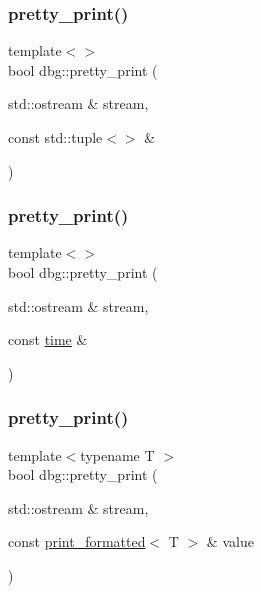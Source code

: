 \mbox{\label{namespacedbg_a077f3d4254963a89c600b07eb1b8608b}} 
\subsubsection{\texorpdfstring{pretty\+\_\+print()}{pretty\_print()}\hspace{0.1cm}{\footnotesize\ttfamily [12/19]}}
{\footnotesize\ttfamily template$<$$>$ \\
bool dbg\+::pretty\+\_\+print (\begin{DoxyParamCaption}\item[{std\+::ostream \&}]{stream,  }\item[{const std\+::tuple$<$$>$ \&}]{ }\end{DoxyParamCaption})\hspace{0.3cm}{\ttfamily [inline]}}

\mbox{\label{namespacedbg_a43fb1da62bd4a702ea7ca37e665c53c9}} 
\subsubsection{\texorpdfstring{pretty\+\_\+print()}{pretty\_print()}\hspace{0.1cm}{\footnotesize\ttfamily [13/19]}}
{\footnotesize\ttfamily template$<$$>$ \\
bool dbg\+::pretty\+\_\+print (\begin{DoxyParamCaption}\item[{std\+::ostream \&}]{stream,  }\item[{const \hyperlink{structdbg_1_1time}{time} \&}]{ }\end{DoxyParamCaption})\hspace{0.3cm}{\ttfamily [inline]}}

\mbox{\label{namespacedbg_a3f0682f5939ac9a18ba7ee86a5c63243}} 
\subsubsection{\texorpdfstring{pretty\+\_\+print()}{pretty\_print()}\hspace{0.1cm}{\footnotesize\ttfamily [14/19]}}
{\footnotesize\ttfamily template$<$typename T $>$ \\
bool dbg\+::pretty\+\_\+print (\begin{DoxyParamCaption}\item[{std\+::ostream \&}]{stream,  }\item[{const \hyperlink{structdbg_1_1print__formatted}{print\+\_\+formatted}$<$ T $>$ \&}]{value }\end{DoxyParamCaption})\hspace{0.3cm}{\ttfamily [inline]}}

